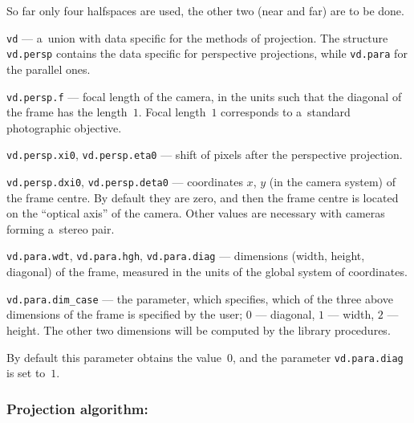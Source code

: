 \begin{mydescription}
    So far only four halfspaces are used, the other two (near and far) are
    to be done.
  \item[]\texttt{vd} --- a~union with data specific for the methods of
    projection. The structure \texttt{vd.persp} contains the data specific
    for perspective projections, while \texttt{vd.para} for the parallel
    ones.
  \item[]\texttt{vd.persp.f} --- focal length of the camera, in the units
    such that the diagonal of the frame has the length~$1$.
    Focal length~$1$ corresponds to a~standard photographic objective.
  \item[]\texttt{vd.persp.xi0}, \texttt{vd.persp.eta0} --- shift of pixels
   after the perspective projection.
  \item[]\texttt{vd.persp.dxi0}, \texttt{vd.persp.deta0} --- coordinates
    $x$, $y$ (in the camera system) of the frame centre. By default they are
    zero, and then the frame centre is located on the ``optical axis'' of
    the camera. Other values are necessary with cameras forming a~stereo
    pair.
  \item[]\texttt{vd.para.wdt}, \texttt{vd.para.hgh}, \texttt{vd.para.diag}
    --- dimensions (width, height, diagonal) of the frame, measured in the
    units of the global system of coordinates.
  \item[]\texttt{vd.para.dim\_case} --- the parameter, which specifies,
    which of the three above dimensions of the frame is specified by the
    user; $0$ --- diagonal, $1$ --- width, $2$ --- height.
    The other two dimensions will be computed by the library procedures.

    By default this parameter obtains the value~$0$, and the parameter
    \texttt{vd.para.diag} is set to~$1$.
\end{mydescription}

\subsubsection*{Projection algorithm:}

